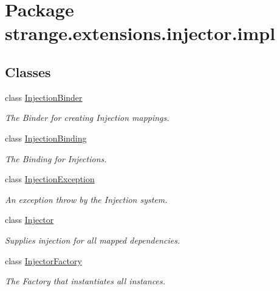 \hypertarget{namespacestrange_1_1extensions_1_1injector_1_1impl}{\section{Package strange.\-extensions.\-injector.\-impl}
\label{namespacestrange_1_1extensions_1_1injector_1_1impl}
}
\subsection*{Classes}
\begin{DoxyCompactItemize}
\item 
class \hyperlink{classstrange_1_1extensions_1_1injector_1_1impl_1_1_injection_binder}{Injection\-Binder}
\begin{DoxyCompactList}\small\item\em The Binder for creating Injection mappings. \end{DoxyCompactList}\item 
class \hyperlink{classstrange_1_1extensions_1_1injector_1_1impl_1_1_injection_binding}{Injection\-Binding}
\begin{DoxyCompactList}\small\item\em The Binding for Injections. \end{DoxyCompactList}\item 
class \hyperlink{classstrange_1_1extensions_1_1injector_1_1impl_1_1_injection_exception}{Injection\-Exception}
\begin{DoxyCompactList}\small\item\em An exception throw by the Injection system. \end{DoxyCompactList}\item 
class \hyperlink{classstrange_1_1extensions_1_1injector_1_1impl_1_1_injector}{Injector}
\begin{DoxyCompactList}\small\item\em Supplies injection for all mapped dependencies. \end{DoxyCompactList}\item 
class \hyperlink{classstrange_1_1extensions_1_1injector_1_1impl_1_1_injector_factory}{Injector\-Factory}
\begin{DoxyCompactList}\small\item\em The Factory that instantiates all instances. \end{DoxyCompactList}\end{DoxyCompactItemize}
